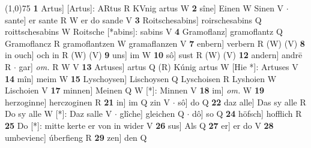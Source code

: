 \documentclass[8pt,a4paper,notitlepage]{article}
\begin{document}
\begin{table}[ht]
\begin{minipage}[t]{0.5\linewidth}
\line(1,0){75} \newline
\textbf{1} Artus] [Artus]: ARtus R KVnig artus W \textbf{2} sîne] Einen W Sinen V  $\cdot$ sante] er sante R W er do sande V \textbf{3} Roitschesabins] roirschesabins Q roittschesabins W Roitsche [*abins]: sabins V \textbf{4} Gramoflanz] gramoflantz Q Gramoflancz R gramoflantzen W gramaflanzen V \textbf{7} enbern] verbern R (W) (V) \textbf{8} in ouch] och in R (W) (V) \textbf{9} uns] im W \textbf{10} sô] sust R (W) (V) \textbf{12} andern] andrē R  $\cdot$ gar] \textit{om.} R W V \textbf{13} Artuses] artus Q (R) Kúnig artus W [Hie *]: Artuses V \textbf{14} mîn] meim W \textbf{15} Lyschoysen] Lischoysen Q Lyschoisen R Lyshoien W Lischoien V \textbf{17} minnen] Meinen Q W [*]: Minnen V \textbf{18} im] \textit{om.} W \textbf{19} herzoginne] herczoginen R \textbf{21} in] im Q zin V  $\cdot$ sô] do Q \textbf{22} daz alle] Das sy alle R Do sy alle W [*]: Daz salle V  $\cdot$ glîche] gleichen Q  $\cdot$ dô] so Q \textbf{24} höfsch] hofflich R \textbf{25} Do [*]: mitte kerte er von in wider V \textbf{26} sus] Als Q \textbf{27} er] er do V \textbf{28} umbevienc] úberfieng R \textbf{29} zen] den Q \newline
\end{minipage}
\end{table}
\end{document}
